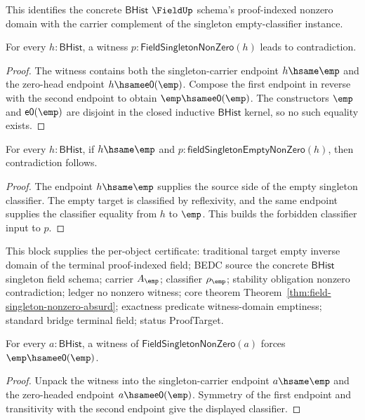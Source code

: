 This identifies the concrete $\mathsf{BHist}$ $\FieldUp$ schema's
proof-indexed nonzero domain with the carrier complement of the singleton
empty-classifier instance.

\begin{theorem}
\label{thm:field-singleton-nonzero-absurd}
For every $h:\mathsf{BHist}$, a witness
$p:\mathsf{FieldSingletonNonZero}(h)$ leads to contradiction.
\end{theorem}
\begin{proof}
The witness contains both the singleton-carrier endpoint $h\hsame\emp$ and
the zero-head endpoint $h\hsame\mathsf{e0}(\emp)$. Compose the first endpoint
in reverse with the second endpoint to obtain
$\emp\hsame\mathsf{e0}(\emp)$. The constructors $\emp$ and
$\mathsf{e0}(\emp)$ are disjoint in the closed inductive $\mathsf{BHist}$
kernel, so no such equality exists.
\end{proof}

\begin{theorem}
\label{thm:field-singleton-nonzero-empty-endpoint-absurd}
For every $h:\mathsf{BHist}$, if $h\hsame\emp$ and
$p:\mathsf{fieldSingletonEmptyNonZero}(h)$, then contradiction follows.
\end{theorem}
\begin{proof}
The endpoint $h\hsame\emp$ supplies the source side of the empty singleton
classifier. The empty target is classified by reflexivity, and the same
endpoint supplies the classifier equality from $h$ to $\emp$. This builds the
forbidden classifier input to $p$.
\end{proof}

This block supplies the per-object certificate: traditional target empty
inverse domain of the terminal proof-indexed field; BEDC source the concrete
$\mathsf{BHist}$ singleton field schema; carrier $A_{\emp}$; classifier
$\rho_{\emp}$; stability obligation nonzero contradiction; ledger no nonzero
witness; core theorem Theorem~\ref{thm:field-singleton-nonzero-absurd};
exactness predicate witness-domain emptiness; standard bridge terminal field;
status ProofTarget.

\begin{theorem}
\label{thm:field-singleton-nonzero-empty-e0-forced}
For every $a:\mathsf{BHist}$, a witness of
$\mathsf{FieldSingletonNonZero}(a)$ forces
$\emp\hsame\mathsf{e0}(\emp)$.
\end{theorem}
\begin{proof}
Unpack the witness into the singleton-carrier endpoint $a\hsame\emp$ and the
zero-headed endpoint $a\hsame\mathsf{e0}(\emp)$. Symmetry of the first endpoint
and transitivity with the second endpoint give the displayed classifier.
\end{proof}

